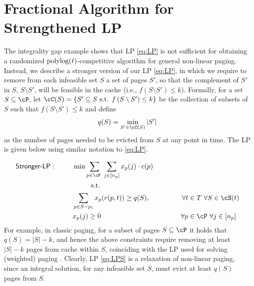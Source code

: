 





\section{Fractional Algorithm for Strengthened LP}%
\label{sec:stronger}


The integrality gap example shows that LP \eqref{eq:LP} is not sufficient for obtaining a randomized $\textnormal{polylog}(\ell)$-competitive algorithm for general non-linear paging. Instead, we describe a stronger version of our LP \eqref{eq:LP}, %
in which we require to remove from each infeasible set $S$ a set of pages $S'$, so that the complement of $S'$ in $S$, $S \setminus S'$, will be feasible in the cache (i.e., $ f\left(S \setminus S'\right) \leq k$).  
Formally, for a set $S \subseteq \cP$, let $\cC(S) = \left\{S' \subseteq S \text{ s.t. } f\left(S \setminus S'\right) \leq k\right\}$ be the collection of subsets of $S$ such that $ f\left(S \setminus S'\right) \leq k$ and define
\begin{equation}
	\label{eq:q(S)}
	q(S) = \min_{S' \in \cC(S)} \left|S'\right|
\end{equation}
as the number of pages needed to be evicted from $S$ at any point in time. 
The LP is given below using similar notation to \eqref{eq:LP}.


\begin{equation}
	\label{eq:LPS}
	\begin{aligned}
		\textsf{Stronger-LP}:~~~~~~~~	& \min \sum_{p \in \cP~} \sum_{j \in [n_p]}  x_p(j) \cdot c(p)\\
		& ~~~~~~~~\text{s.t. }\\
		& \sum_{p \in S-p_t} x_p(r(p,t)) \geq q(S), 	~~~~~~~~~~~~~~\forall t \in T~\forall S  \in \cS(t) \\ 
		& x_p(j) \geq 0 ~~~~~~~~~~~~~~~~~~~~~~~~~~~~~~~~~~~	\forall p \in \cP~\forall j \in [n_p]
	\end{aligned}
\end{equation} For example, in classic paging, for a subset of pages $S \subseteq \cP$ it holds that $q(S) = |S|-k$, and hence the above constraints require removing at least $|S|-k$ pages from cache within $S$, coinciding with the LP used for solving (weighted) paging \cite{bansal2012primal}. %
Clearly, LP \eqref{eq:LPS} is a relaxation of non-linear paging, since an integral solution, for any infeasible set $S$, must evict at least $q(S)$ pages from $S$. 








